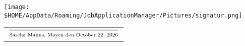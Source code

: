 \documentclass[a4paper]{friggeri-cv} %
\begin{document}


\begin{center}
\texttt{[image: \$HOME/AppData/Roaming/JobApplicationManager/Pictures/signatur.png]} \\
\begin{tabular}{@{}l@{}}
\\ $\frac{}{\strut\textnormal{Sascha Manns, Mayen den \today}}$
\end{tabular}
\end{center}

\end{document}
